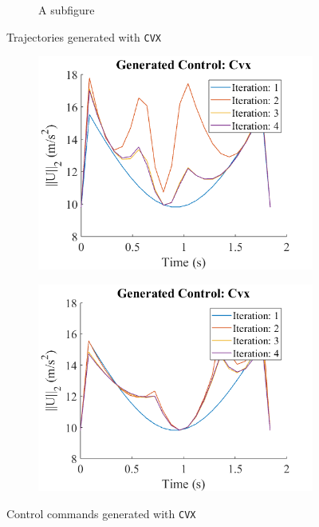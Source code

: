 \documentclass{article}
\begin{document}
\begin{figure}[H]
\begin{subfigure}{.5\textwidth}
    \caption{A subfigure}
    \label{fig:cvx_traj2}
  \end{subfigure}
  \caption{Trajectories generated with \texttt{CVX}}
  \label{fig:cvx_trajectories}
\end{figure}

\begin{figure}[H]
  \centering
  \begin{subfigure}{.5\textwidth}
    \centering
    \includegraphics[width=\linewidth]{images/cvx/traj1_controls.png}
    \label{fig:cvx_contr1}
  \end{subfigure}%
  \begin{subfigure}{.5\textwidth}
    \centering
    \includegraphics[width=\linewidth]{images/cvx/traj2_controls.png}
    \label{fig:cvx_contr2}
  \end{subfigure}
  \caption{Control commands generated with \texttt{CVX}}
  \label{fig:cvx_controls}
\end{figure}
\end{document}

